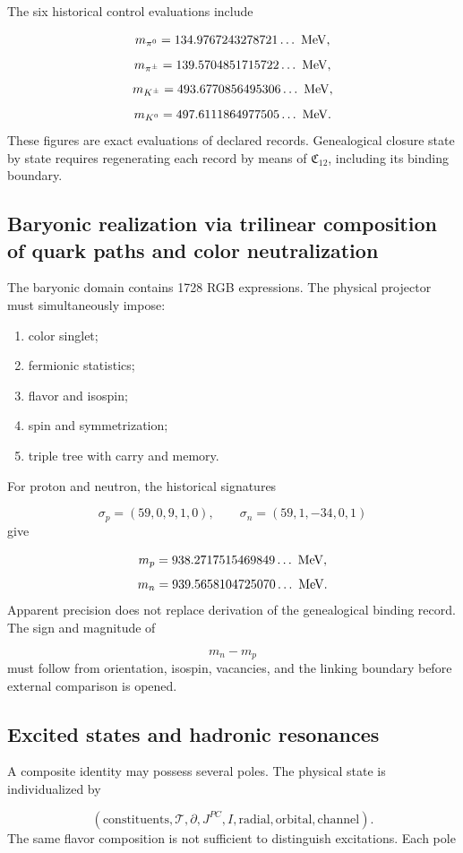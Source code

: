The six historical control evaluations include

\[
 m_{\pi^0}=134.9767243278721\ldots\ {\rm MeV},
\]
\[
 m_{\pi^\pm}=139.5704851715722\ldots\ {\rm MeV},
\]
\[
 m_{K^\pm}=493.6770856495306\ldots\ {\rm MeV},
\]
\[
 m_{K^0}=497.6111864977505\ldots\ {\rm MeV}.
\]
These figures are exact evaluations of declared records. Genealogical closure state by state requires regenerating each record by means of \(\mathfrak C_{12}\), including its binding boundary.

\subsection{Baryonic realization via trilinear composition of quark paths and color neutralization}
The baryonic domain contains 1728 RGB expressions. The physical projector must simultaneously impose:

\begin{enumerate}
\item color singlet;
\item fermionic statistics;
\item flavor and isospin;
\item spin and symmetrization;
\item triple tree with carry and memory.
\end{enumerate}
For proton and neutron, the historical signatures

\[
 \sigma_p=(59,0,9,1,0),\qquad
 \sigma_n=(59,1,-34,0,1)
\]
give

\[
 m_p=938.2717515469849\ldots\ {\rm MeV},
\]
\[
 m_n=939.5658104725070\ldots\ {\rm MeV}.
\]
Apparent precision does not replace derivation of the genealogical binding
record. The sign and magnitude of

\[
 m_n-m_p
\]
must follow from orientation, isospin, vacancies, and the linking boundary before external comparison is opened.

\subsection{Excited states and hadronic resonances}
A composite identity may possess several poles. The physical state is individualized by

\[
 (\text{constituents},\mathcal T,\partial,
 J^{PC},I,\text{radial},\text{orbital},\text{channel}).
\]
The same flavor composition is not sufficient to distinguish excitations. Each pole


